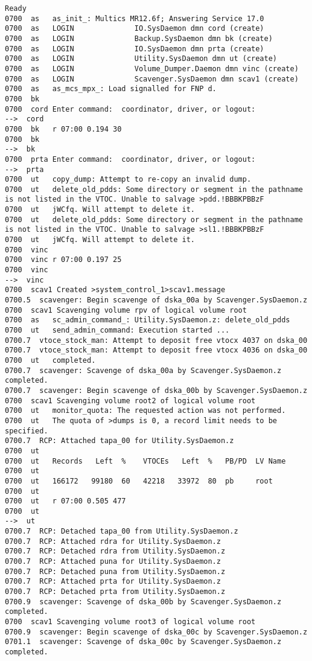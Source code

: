 \begin{lstlisting}
Ready
0700  as   as_init_: Multics MR12.6f; Answering Service 17.0
0700  as   LOGIN              IO.SysDaemon dmn cord (create)
0700  as   LOGIN              Backup.SysDaemon dmn bk (create)
0700  as   LOGIN              IO.SysDaemon dmn prta (create)
0700  as   LOGIN              Utility.SysDaemon dmn ut (create)
0700  as   LOGIN              Volume_Dumper.Daemon dmn vinc (create)
0700  as   LOGIN              Scavenger.SysDaemon dmn scav1 (create)
0700  as   as_mcs_mpx_: Load signalled for FNP d.
0700  bk   
0700  cord Enter command:  coordinator, driver, or logout:
-->  cord
0700  bk   r 07:00 0.194 30
0700  bk   
-->  bk
0700  prta Enter command:  coordinator, driver, or logout:
-->  prta
0700  ut   copy_dump: Attempt to re-copy an invalid dump.
0700  ut   delete_old_pdds: Some directory or segment in the pathname is not listed in the VTOC. Unable to salvage >pdd.!BBBKPBBzF
0700  ut   jWCfq. Will attempt to delete it.
0700  ut   delete_old_pdds: Some directory or segment in the pathname is not listed in the VTOC. Unable to salvage >sl1.!BBBKPBBzF
0700  ut   jWCfq. Will attempt to delete it.
0700  vinc 
0700  vinc r 07:00 0.197 25
0700  vinc 
-->  vinc
0700  scav1 Created >system_control_1>scav1.message
0700.5  scavenger: Begin scavenge of dska_00a by Scavenger.SysDaemon.z
0700  scav1 Scavenging volume rpv of logical volume root
0700  as   sc_admin_command_: Utility.SysDaemon.z: delete_old_pdds
0700  ut   send_admin_command: Execution started ... 
0700.7  vtoce_stock_man: Attempt to deposit free vtocx 4037 on dska_00
0700.7  vtoce_stock_man: Attempt to deposit free vtocx 4036 on dska_00
0700  ut   completed.
0700.7  scavenger: Scavenge of dska_00a by Scavenger.SysDaemon.z completed.
0700.7  scavenger: Begin scavenge of dska_00b by Scavenger.SysDaemon.z
0700  scav1 Scavenging volume root2 of logical volume root
0700  ut   monitor_quota: The requested action was not performed. 
0700  ut   The quota of >dumps is 0, a record limit needs to be specified.
0700.7  RCP: Attached tapa_00 for Utility.SysDaemon.z
0700  ut   
0700  ut   Records   Left  %    VTOCEs   Left  %   PB/PD  LV Name
0700  ut   
0700  ut   166172   99180  60   42218   33972  80  pb     root
0700  ut   
0700  ut   r 07:00 0.505 477
0700  ut   
-->  ut
0700.7  RCP: Detached tapa_00 from Utility.SysDaemon.z
0700.7  RCP: Attached rdra for Utility.SysDaemon.z
0700.7  RCP: Detached rdra from Utility.SysDaemon.z
0700.7  RCP: Attached puna for Utility.SysDaemon.z
0700.7  RCP: Detached puna from Utility.SysDaemon.z
0700.7  RCP: Attached prta for Utility.SysDaemon.z
0700.7  RCP: Detached prta from Utility.SysDaemon.z
0700.9  scavenger: Scavenge of dska_00b by Scavenger.SysDaemon.z completed.
0700  scav1 Scavenging volume root3 of logical volume root
0700.9  scavenger: Begin scavenge of dska_00c by Scavenger.SysDaemon.z
0701.1  scavenger: Scavenge of dska_00c by Scavenger.SysDaemon.z completed.
\end{lstlisting}

